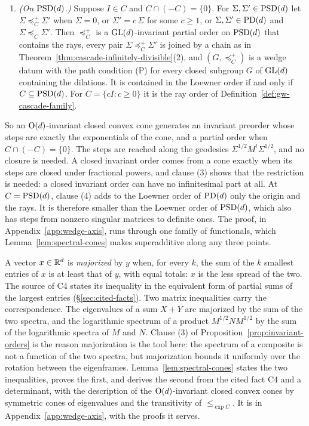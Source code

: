 \begin{theorem}
\begin{enumerate}
$\preceq_{C'}$ for no cone $C'$.
\item \emph{(On $\mathrm{PSD}(d)$.)} Suppose $I \in C$ and $C \cap (-C) = \{0\}$. For $\Sigma, \Sigma' \in
\mathrm{PSD}(d)$ let $\Sigma \preceq^+_C \Sigma'$ when $\Sigma = 0$, or $\Sigma' = c\,\Sigma$ for some $c \ge 1$,
or $\Sigma, \Sigma' \in \mathrm{PD}(d)$ and $\Sigma \preceq_C \Sigma'$. Then $\preceq^+_C$ is a $\mathrm{GL}(d)$-invariant
partial order on $\mathrm{PSD}(d)$ that contains the rays, every pair $\Sigma \preceq^+_C \Sigma'$ is joined by a
chain as in Theorem~\ref{thm:cascade-infinitely-divisible}(2), and $(G, \preceq^+_C)$ is a wedge datum with the
path condition (P) for every closed subgroup $G$ of $\mathrm{GL}(d)$ containing the dilations. It is contained in
the Loewner order if and only if $C \subseteq \mathrm{PSD}(d)$. For $C = \{cI : c \ge 0\}$ it is the ray order of
Definition~\ref{def:gw-cascade-family}.
\end{enumerate}
\end{theorem}

So an $\mathrm{O}(d)$-invariant closed convex cone generates an invariant preorder whose steps are exactly
the exponentials of the cone, and a partial order when $C \cap (-C) = \{0\}$. The steps are reached along the geodesics $\Sigma^{1/2}M^t\Sigma^{1/2}$, and
no closure is needed. A closed invariant order comes from a cone exactly when its steps are closed
under fractional powers, and clause (3) shows that the restriction is needed: a closed invariant
order can have no infinitesimal part at all. At $C = \mathrm{PSD}(d)$, clause (4) adds to the Loewner order of
$\mathrm{PD}(d)$ only the origin and the rays. It is therefore smaller than the Loewner order of $\mathrm{PSD}(d)$,
which also has steps from nonzero singular matrices to definite ones. The proof, in
Appendix~\ref{app:wedge-axis}, runs through one family of functionals, which
Lemma~\ref{lem:spectral-cones} makes superadditive along any three points.

A vector $x \in \mathbb{R}^d$ is \emph{majorized} by $y$ when, for every $k$, the sum of the $k$ smallest
entries of $x$ is at least that of $y$, with equal totals: $x$ is the less spread of the two.
The source of C4 states its inequality in the equivalent form of partial sums of the largest entries
(\S\ref{sec:cited-facts}). Two matrix inequalities
carry the correspondence. The eigenvalues of a sum $X + Y$ are majorized by the sum of the two
spectra, and the logarithmic spectrum of a product $M^{1/2}NM^{1/2}$ by the sum of the logarithmic
spectra of $M$ and $N$. Clause (3) of Proposition~\ref{prop:invariant-orders} is the reason
majorization is the tool here: the spectrum of a composite is not a function of the two spectra, but
majorization bounds it uniformly over the rotation between the eigenframes.
Lemma~\ref{lem:spectral-cones} states the two inequalities, proves the first, and derives the second
from the cited fact C4 and a determinant, with the description of the $\mathrm{O}(d)$-invariant closed
convex cones by symmetric cones of eigenvalues and the transitivity of $\le_{\exp C}$. It is in
Appendix~\ref{app:wedge-axis}, with the proofs it serves.

